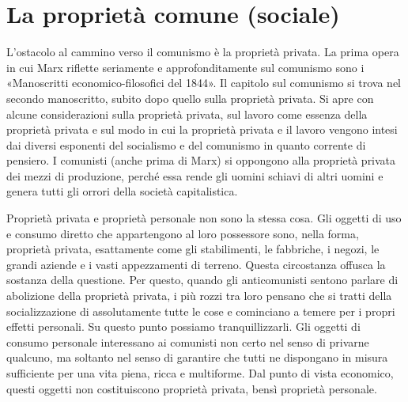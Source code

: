 \documentclass[12pt,a4paper,openany]{book}
\begin{document}
\section{La proprietà comune (sociale)}
\label{sec:05_proprieta_comune}

L'ostacolo al cammino verso il comunismo è la proprietà privata. La prima opera in cui Marx riflette seriamente e approfonditamente sul comunismo sono i «Manoscritti economico-filosofici del 1844». Il capitolo sul comunismo si trova nel secondo manoscritto, subito dopo quello sulla proprietà privata. Si apre con alcune considerazioni sulla proprietà privata, sul lavoro come essenza della proprietà privata e sul modo in cui la proprietà privata e il lavoro vengono intesi dai diversi esponenti del socialismo e del comunismo in quanto corrente di pensiero. I comunisti (anche prima di Marx) si oppongono alla proprietà privata dei mezzi di produzione, perché essa rende gli uomini schiavi di altri uomini e genera tutti gli orrori della società capitalistica.

Proprietà privata e proprietà personale non sono la stessa cosa. Gli oggetti di uso e consumo diretto che appartengono al loro possessore sono, nella forma, proprietà privata, esattamente come gli stabilimenti, le fabbriche, i negozi, le grandi aziende e i vasti appezzamenti di terreno. Questa circostanza offusca la sostanza della questione. Per questo, quando gli anticomunisti sentono parlare di abolizione della proprietà privata, i più rozzi tra loro pensano che si tratti della socializzazione di assolutamente tutte le cose e cominciano a temere per i propri effetti personali. Su questo punto possiamo tranquillizzarli. Gli oggetti di consumo personale interessano ai comunisti non certo nel senso di privarne qualcuno, ma soltanto nel senso di garantire che tutti ne dispongano in misura sufficiente per una vita piena, ricca e multiforme. Dal punto di vista economico, questi oggetti non costituiscono proprietà privata, bensì proprietà personale.
\end{document}

